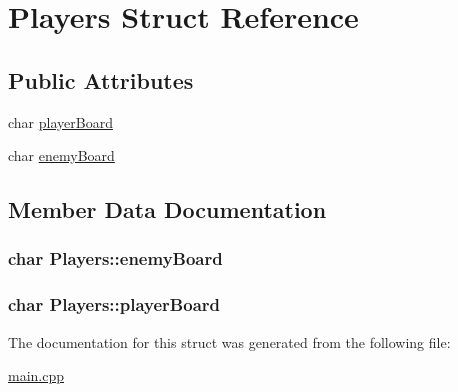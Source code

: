 \hypertarget{struct_players}{\section{Players Struct Reference}
\label{struct_players}
}
\subsection*{Public Attributes}
\begin{DoxyCompactItemize}
\item 
char \hyperlink{struct_players_a7555239777655b031352ab44d1b4732a}{player\+Board}
\item 
char \hyperlink{struct_players_a0a340219c608e358abbb78f5d2d9a084}{enemy\+Board}
\end{DoxyCompactItemize}


\subsection{Member Data Documentation}
\hypertarget{struct_players_a0a340219c608e358abbb78f5d2d9a084}{
\subsubsection[{enemy\+Board}]{\setlength{\rightskip}{0pt plus 5cm}char Players\+::enemy\+Board}}\label{struct_players_a0a340219c608e358abbb78f5d2d9a084}
\hypertarget{struct_players_a7555239777655b031352ab44d1b4732a}{
\subsubsection[{player\+Board}]{\setlength{\rightskip}{0pt plus 5cm}char Players\+::player\+Board}}\label{struct_players_a7555239777655b031352ab44d1b4732a}


The documentation for this struct was generated from the following file\+:\begin{DoxyCompactItemize}
\item 
\hyperlink{main_8cpp}{main.\+cpp}\end{DoxyCompactItemize}
